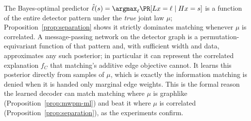 \begin{remark}
\label{rem:capacity}
The Bayes-optimal predictor $\hat\ell(s)=\argmax_\ell\PR[Lx=\ell\mid Hx=s]$ is a
function of the entire detector pattern under the \emph{true} joint law $\mu$;
Proposition~\ref{prop:separation} shows it strictly dominates matching whenever
$\mu$ is correlated. A message-passing network on the detector graph is a
permutation-equivariant function of that pattern and, with sufficient width and
data, approximates any such posterior; in particular it can represent the
correlated explanation $f_C$ that matching's additive edge objective cannot. It
learns this posterior directly from samples of $\mu$, which is exactly the
information matching is denied when it is handed only marginal edge weights. This
is the formal reason the learned decoder can match matching where $\mu$ is
graphlike (Proposition~\ref{prop:mwpm-ml}) and beat it where $\mu$ is correlated
(Proposition~\ref{prop:separation}), as the experiments confirm.
\end{remark}
